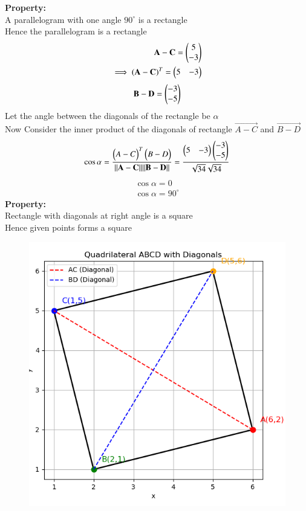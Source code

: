 \documentclass[journal,12pt,onecolumn]{IEEEtran}
\begin{document}
      \textbf{Property:}\\
      A parallelogram with one angle $90^\circ$ is a rectangle\\
      Hence the parallelogram is a rectangle\\
      \begin{align}
      \mathbf{A-C}=\begin{pmatrix}5\\-3\end{pmatrix}\\
      \implies \mathbf{(A-C)}^T=\begin{pmatrix}5 & -3\end{pmatrix}
      \end{align}
      \begin{align}
          \mathbf{B-D}=\begin{pmatrix}-3\\-5\end{pmatrix}
      \end{align}
      Let the angle between the diagonals of the rectangle be $\alpha$\\
      Now Consider the inner product of the diagonals of rectangle $\vec{A-C}$ and $\vec{B-D}$ \\
      \begin{align}
      \cos{\alpha}=\frac{\begin{pmatrix}A-C\end{pmatrix}^T\begin{pmatrix}B-D\end{pmatrix}}{\|\mathbf{A-C}\|\|\mathbf{B-D}\|}=\frac{\begin{pmatrix}5&-3\end{pmatrix}\begin{pmatrix}-3\\-5\end{pmatrix}}{\sqrt{34}\sqrt{34}}
      \end{align}
      \begin{align}
          \cos{\alpha}=0\\
          \cos{\alpha}=90^\circ
      \end{align}
      \textbf{Property:}\\
      Rectangle with diagonals at right angle is a square\\
      Hence given points forms a square\\
      \begin{figure}[H]
          \centering
          \includegraphics[width=0.7\linewidth]{figs/fig1.png}
	      \caption{}
	      \label{fig}
      \end{figure}
\end{document}
